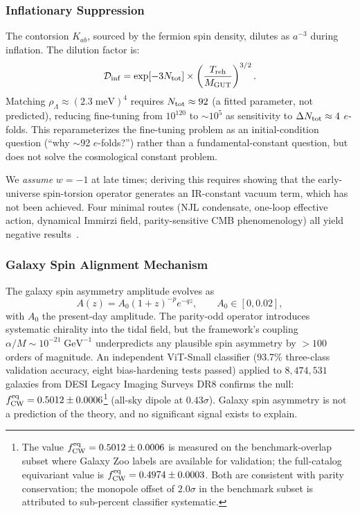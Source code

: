 \documentclass[aps,prd,twocolumn,superscriptaddress,showpacs,preprintnumbers,nofootinbib,longbibliography,floatfix]{revtex4-2}
\newcommand{\Dinf}{\mathcal{D}_{\rm inf}}
\newcommand{\fcw}{f_{\rm CW}}
\begin{document}
\subsubsection{Inflationary Suppression}\label{sec:dilution}

The contorsion $K_{ab}$, sourced by the fermion spin density, dilutes as $a^{-3}$ during inflation. The dilution factor is:
\begin{equation}\label{eq:Dinf}
\Dinf = \exp[-3N_{\rm tot}] \times \left(\frac{T_{\rm reh}}{M_{\rm GUT}}\right)^{3/2}.
\end{equation}
Matching $\rho_\Lambda \approx (2.3\;\text{meV})^4$ requires $N_{\rm tot} \approx 92$ (a fitted parameter, not predicted), reducing fine-tuning from $10^{120}$ to $\sim 10^5$ as sensitivity to $\Delta N_{\rm tot} \approx 4$ $e$-folds. This reparameterizes the fine-tuning problem as an initial-condition question (``why $\sim$92 $e$-folds?'') rather than a fundamental-constant question, but does not solve the cosmological constant problem.

We \textit{assume} $w = -1$ at late times; deriving this requires showing that the early-universe spin-torsion operator generates an IR-constant vacuum term, which has not been achieved. Four minimal routes (NJL condensate, one-loop effective action, dynamical Immirzi field, parity-sensitive CMB phenomenology) all yield negative results~\cite{Golden2026supplement}.

\subsubsection{Galaxy Spin Alignment Mechanism}\label{sec:spinmech}

The galaxy spin asymmetry amplitude evolves as
\begin{equation}
A(z) = A_0(1+z)^{-p}e^{-qz}, \qquad A_0 \in [0,0.02],
\label{eq:Az}
\end{equation}
with $A_0$ the present-day amplitude. The parity-odd operator introduces systematic chirality into the tidal field, but the framework's coupling $\alpha/M \sim 10^{-21}\;\text{GeV}^{-1}$ underpredicts any plausible spin asymmetry by $>100$ orders of magnitude. An independent ViT-Small classifier (93.7\% three-class validation accuracy, eight bias-hardening tests passed) applied to $8{,}474{,}531$ galaxies from DESI Legacy Imaging Surveys DR8 confirms the null: $\fcw^{\rm eq} = 0.5012 \pm 0.0006$\footnote{\label{fn:fcw}The value $\fcw^{\rm eq} = 0.5012 \pm 0.0006$ is measured on the benchmark-overlap subset where Galaxy Zoo labels are available for validation; the full-catalog equivariant value is $\fcw^{\rm eq} = 0.4974 \pm 0.0003$. Both are consistent with parity conservation; the monopole offset of $2.0\sigma$ in the benchmark subset is attributed to sub-percent classifier systematic.} (all-sky dipole at $0.43\sigma$). Galaxy spin asymmetry is not a prediction of the theory, and no significant signal exists to explain.
\end{document}
